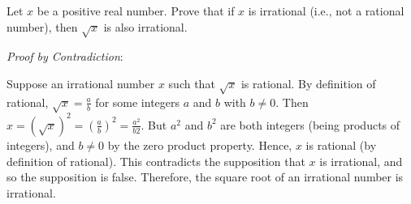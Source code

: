 \question Let $x$ be a positive real number. Prove that if 
$x$ is irrational (i.e., not a rational number), then $\sqrt{x}$ 
is also irrational.

\begin{solution}[3in]

\textit{Proof by Contradiction}:

Suppose an irrational number $x$ such that $\sqrt{x}$ is rational.
By definition of rational, $\sqrt{x} = \frac{a}{b}$ for some integers 
$a$ and $b$ with $b \neq 0$. Then $x = (\sqrt{x})^2 = (\frac{a}{b})^2 
= \frac{a^2}{b2}$. But $a^2$ and $b^2$ are both integers 
(being products of integers), and $b \neq 0$ by the zero product property. 
Hence, $x$ is rational (by definition of rational). This contradicts the 
supposition that $x$ is irrational, and so the supposition is false. 
Therefore, the square root of an irrational number is irrational.
\end{solution}
